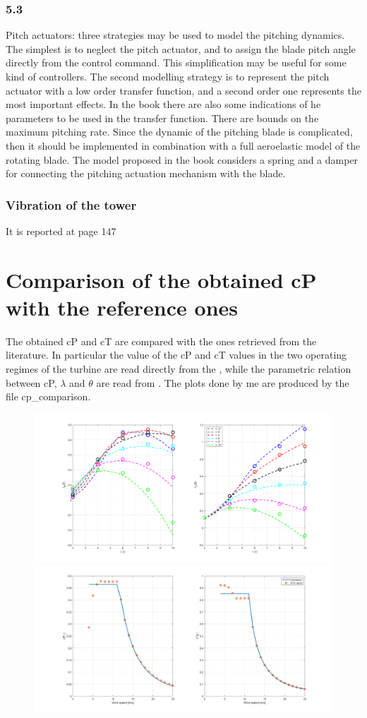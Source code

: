 \documentclass[]{article}
\begin{document}
\subsubsection{5.3}
Pitch actuators: three strategies may be used to model the pitching dynamics. The simplest is to neglect the pitch actuator, and to assign the blade pitch angle directly from the control command. This simplification may be useful for some kind of controllers. The second modelling strategy is to represent the pitch actuator with a low order transfer function, and a second order one represents the most important effects. In the book there are also some indications of he parameters to be used in the transfer function. There are bounds on the maximum pitching rate. Since the dynamic of the pitching blade is complicated, then it should be implemented in combination with a full aeroelastic model of the rotating blade. The model proposed in the book considers a spring and a damper for connecting the pitching actuation mechanism with the blade.
\subsubsection{Vibration of the tower}
It is reported at page 147
\newpage
\section{Comparison of the obtained cP with the reference ones}
The obtained cP and cT are compared with the ones retrieved from the literature. In particular the value of the cP and cT values in the two operating regimes of the turbine are read directly from the \cite{DTU_Wind_Energy_Report-I-0092}, while the parametric relation between cP, $\lambda$ and $\theta$ are read from \cite{Variable-speed_Variable-pitch_control_for_a_wind_t}. The plots done by me are produced by the file cp\_comparison. 
\begin{figure}[H]
	\centering
	\includegraphics[width=0.7\linewidth]{images/cp_parametric_comp.png}
	\includegraphics[width=0.7\linewidth]{images/cp_DTU10MW_comp.png}
	\caption{}
	\label{fig:cpparametriccomp}
\end{figure}
\end{document}
